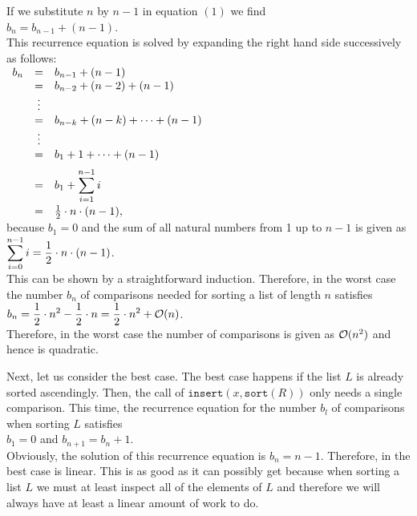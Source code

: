 If we substitute $n$ by $n-1$ in equation $(1)$ we find
\\[0.2cm]
\hspace*{1.3cm}
$b_n = b_{n-1} + (n - 1)$.
\\[0.2cm]
This recurrence equation is solved by expanding the right hand side successively as follows:
\\[0.2cm]
\hspace*{1.3cm}
$
\begin{array}[t]{lcl}
  b_{n} & = & b_{n-1} + (n - 1)                     \\ 
        & = & b_{n-2} + (n - 2) + (n - 1)           \\ 
        & \vdots &                                  \\
        & = & b_{n-k} + (n - k) + \cdots + (n - 1)  \\ 
        & \vdots &                                  \\
        & = & b_{1} + 1 + \cdots + (n - 1)      \\[0.2cm] 
        & = & \displaystyle b_{1} + \sum\limits_{i = 1}^{n - 1} i \\[0.4cm]
        & = & \frac{1}{2} \cdot n \cdot (n - 1),
\end{array}
$
\\[0.2cm]
because $b_1 = 0$ and the sum of all natural numbers from 1 up to  $n - 1$ is given as
\\[0.2cm]
\hspace*{1.3cm}
$\displaystyle\sum\limits_{i = 0}^{n - 1} i  = \frac{1}{2} \cdot n \cdot (n - 1)$.
\\[0.2cm]
This can be shown by a straightforward induction.  Therefore, in the worst case the number $b_n$ of
comparisons needed for sorting a list of length $n$  satisfies 
\\[0.2cm]
\hspace*{1.3cm}
$\displaystyle b_n = \frac{1}{2} \cdot n^2 - \frac{1}{2} \cdot n = \frac{1}{2} \cdot n^2 + \mathcal{O}(n)$.
\\[0.2cm]
Therefore, in the worst case the number of comparisons is given as $\mathcal{O}(n^2)$ and hence
 is quadratic.


Next, let us consider the best case.  The best case happens if the list $L$ is already sorted
ascendingly.  Then, the call of 
$\mathtt{insert}(x,\mathtt{sort}(R))$ only needs a single comparison.  This time, the recurrence
equation for the number $b_l$ of comparisons when sorting $L$ satisfies
 \\[0.2cm]
\hspace*{1.3cm}
$b_1 = 0$ \quad and \quad $b_{n+1} = b_n + 1$. 
\\[0.2cm]
Obviously, the solution of this recurrence equation is $b_n = n-1$.  Therefore, in the best case
 is linear.  This is as good as it can possibly get because when sorting a list $L$ we
must at least inspect all of the elements of $L$ and therefore we will always have at least a linear
amount of work to do.


